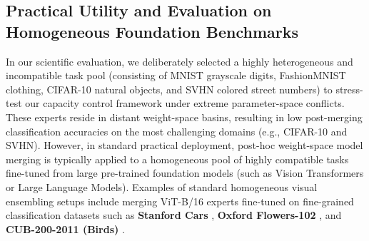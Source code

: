 \subsection{Practical Utility and Evaluation on Homogeneous Foundation Benchmarks}
\label{subsec:homogeneous_benchmarks}

In our scientific evaluation, we deliberately selected a highly heterogeneous and incompatible task pool (consisting of MNIST grayscale digits, FashionMNIST clothing, CIFAR-10 natural objects, and SVHN colored street numbers) to stress-test our capacity control framework under extreme parameter-space conflicts. These experts reside in distant weight-space basins, resulting in low post-merging classification accuracies on the most challenging domains (e.g., CIFAR-10 and SVHN). However, in standard practical deployment, post-hoc weight-space model merging is typically applied to a homogeneous pool of highly compatible tasks fine-tuned from large pre-trained foundation models (such as Vision Transformers or Large Language Models). Examples of standard homogeneous visual ensembling setups include merging ViT-B/16 experts fine-tuned on fine-grained classification datasets such as \textbf{Stanford Cars} \cite{krause20133d}, \textbf{Oxford Flowers-102} \cite{nilsback2008automated}, and \textbf{CUB-200-2011 (Birds)} \cite{wah2011caltech}. 

